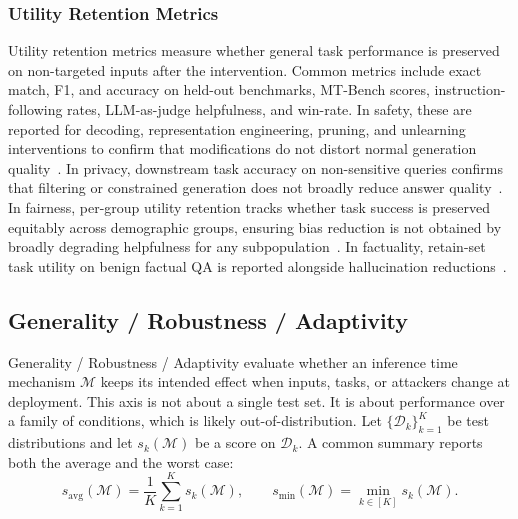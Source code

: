 \subsubsection{Utility Retention Metrics}
Utility retention metrics measure whether general task performance is preserved on non-targeted inputs after the intervention. Common metrics include exact match, F1, and accuracy on held-out benchmarks, MT-Bench scores, instruction-following rates, LLM-as-judge helpfulness, and win-rate. In safety, these are reported for decoding, representation engineering, pruning, and unlearning interventions to confirm that modifications do not distort normal generation quality~\citep{Xu2024SafeDecodingDA, Arditi2024SingleDirection, chen2025safeptr, hasan2024pruning, deng2025guard, zhang2024theft}. In privacy, downstream task accuracy on non-sensitive queries confirms that filtering or constrained generation does not broadly reduce answer quality~\citep{Borec2024TheUI, zou2025poisonedrag}. In fairness, per-group utility retention tracks whether task success is preserved equitably across demographic groups, ensuring bias reduction is not obtained by broadly degrading helpfulness for any subpopulation~\citep{shrestha2024fairrag, cai2024locating, zayed2024fairness, ma2025breaking}. In factuality, retain-set task utility on benign factual QA is reported alongside hallucination reductions~\citep{dhuliawala2024chain, li2023iti, asai2024self, zhou2024metacognitive}.

\subsection{Generality / Robustness / Adaptivity}
Generality / Robustness / Adaptivity evaluate whether an inference time mechanism $\mathcal{M}$ keeps its intended effect when inputs, tasks, or attackers change at deployment. This axis is not about a single test set. It is about performance over a family of conditions, which is likely out-of-distribution. Let $\{\mathcal{D}_k\}_{k=1}^K$ be test distributions and let $s_k(\mathcal{M})$ be a score on $\mathcal{D}_k$. A common summary reports both the average and the worst case:
\[
s_{\mathrm{avg}}(\mathcal{M})=\frac{1}{K}\sum_{k=1}^K s_k(\mathcal{M}),
\qquad
s_{\min}(\mathcal{M})=\min_{k\in[K]} s_k(\mathcal{M}).
\]

